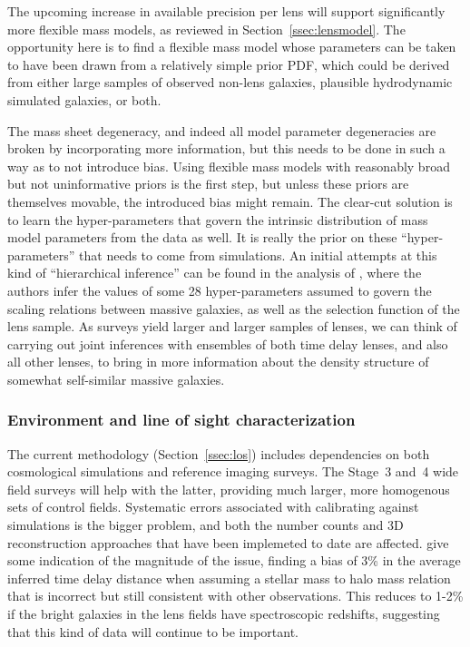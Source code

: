 The upcoming increase in available precision per lens will support
significantly more flexible mass models, as reviewed in
Section~\ref{ssec:lensmodel}.
The opportunity here is to find a flexible mass model whose parameters
can be taken to have been drawn from a relatively simple prior PDF,
which could be derived from either large samples of observed non-lens
galaxies, plausible hydrodynamic simulated galaxies, or both.


The mass sheet degeneracy, and indeed all model parameter degeneracies
are broken by incorporating more information, but this needs to be
done in such a way as to not introduce bias. Using flexible mass
models with reasonably broad but not uninformative priors is the first
step, but unless these priors are themselves movable, the introduced
bias might remain. The clear-cut solution is to learn the
hyper-parameters that govern the intrinsic distribution of mass model
parameters from the data as well. It is really the prior on these
``hyper-parameters'' that needs to come from simulations. An initial
attempts at this kind of ``hierarchical inference'' can be found in
the analysis of \citet{SonnenfeldEtal2015}, where the authors infer
the values of some 28 hyper-parameters assumed to govern the scaling
relations between massive galaxies, as well as the selection function
of the lens sample. As surveys yield larger and larger samples of
lenses, we can think of carrying out joint inferences with ensembles
of both time delay lenses, and also all other lenses, to bring in more
information about the density structure of somewhat self-similar
massive galaxies.


\subsubsection{Environment and line of sight characterization}

The current methodology (Section~\ref{ssec:los}) includes dependencies
on both cosmological simulations and reference imaging surveys. The
Stage~3 and~4 wide field surveys will help with the latter, providing
much larger, more homogenous sets of control fields.  Systematic
errors associated with calibrating against simulations is the bigger
problem, and both the number counts and 3D reconstruction approaches
that have been implemeted to date are affected.
\citet{CollettEtal2013} give some indication of the magnitude of the
issue, finding a bias of 3\% in the average inferred time delay distance
when assuming a stellar mass to halo mass relation that is incorrect
but still consistent with other observations. This reduces to 1-2\%
if the bright galaxies in the lens fields have spectroscopic redshifts,
suggesting that this kind of data will continue to be important.


